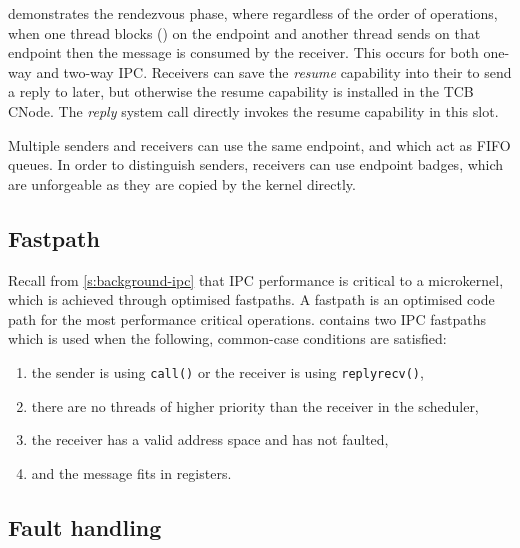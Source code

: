  demonstrates the rendezvous phase, where regardless of the order of operations, 
when one thread blocks () on the endpoint and another thread sends on that endpoint
then the message is consumed by the receiver. This occurs for both one-way and two-way \gls{IPC}.
Receivers can save
the \emph{resume} capability into their  to send a reply to later, but otherwise the resume capability is
installed in the \gls{TCB} CNode. The \emph{reply} system call directly invokes the resume
capability in this slot. 

Multiple senders and receivers can use the same endpoint, and which act as \gls{FIFO}
queues. In order to distinguish senders, receivers can use endpoint badges, which are unforgeable as
they are copied by the kernel directly. 

\subsection{Fastpath}

Recall from \cref{s:background-ipc} that \gls{IPC} performance is critical to a microkernel, which
is achieved through optimised fastpaths. A fastpath is an optimised code path for the most
performance critical operations. \selfour
contains two \gls{IPC} fastpaths which is used when the following, common-case conditions are satisfied:

\begin{enumerate}
    \item the sender is using \texttt{call()} or the receiver is using \texttt{replyrecv()},
    \item there are no threads of higher priority than the receiver in the scheduler,
    \item the receiver has a valid address space and has not faulted,
    \item and the message fits in registers.
\end{enumerate}

\subsection{Fault handling}

